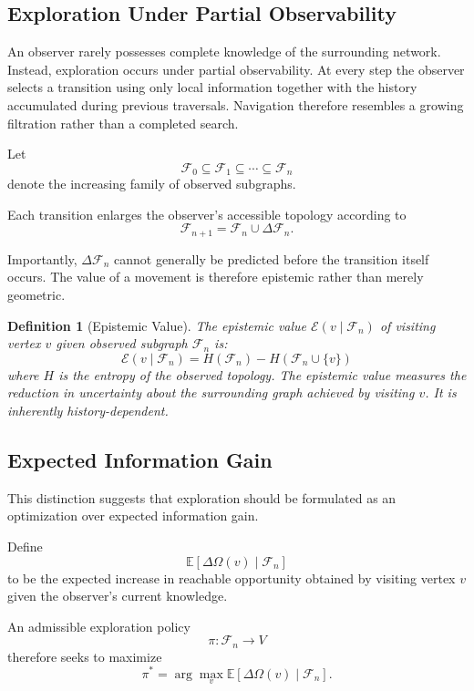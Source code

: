 \documentclass[12pt,oneside]{article}
\newtheorem{definition}{Definition}[section]
\theoremstyle{remark}
\begin{document}
\subsection{Exploration Under Partial Observability}

An observer rarely possesses complete knowledge of the surrounding network. Instead, exploration occurs under partial observability. At every step the observer selects a transition using only local information together with the history accumulated during previous traversals. Navigation therefore resembles a growing filtration rather than a completed search.

Let
\[
\mathcal{F}_0 \subseteq \mathcal{F}_1 \subseteq \cdots \subseteq \mathcal{F}_n
\]
denote the increasing family of observed subgraphs.

Each transition enlarges the observer's accessible topology according to
\[
\mathcal{F}_{n+1} = \mathcal{F}_n \cup \Delta\mathcal{F}_n.
\]

Importantly, \(\Delta\mathcal{F}_n\) cannot generally be predicted before the transition itself occurs. The value of a movement is therefore epistemic rather than merely geometric.

\begin{definition}[Epistemic Value]
The epistemic value \(\mathcal{E}(v \mid \mathcal{F}_n)\) of visiting vertex \(v\) given observed subgraph \(\mathcal{F}_n\) is:
\[
\mathcal{E}(v \mid \mathcal{F}_n) = H(\mathcal{F}_n) - H(\mathcal{F}_n \cup \{v\})
\]
where \(H\) is the entropy of the observed topology. The epistemic value measures the reduction in uncertainty about the surrounding graph achieved by visiting \(v\). It is inherently history-dependent.
\end{definition}

\subsection{Expected Information Gain}

This distinction suggests that exploration should be formulated as an optimization over expected information gain.

Define
\[
\mathbb{E}\left[\Delta\Omega(v) \mid \mathcal{F}_n\right]
\]
to be the expected increase in reachable opportunity obtained by visiting vertex \(v\) given the observer's current knowledge.

An admissible exploration policy
\[
\pi : \mathcal{F}_n \rightarrow V
\]
therefore seeks to maximize
\[
\pi^* = \arg\max_v \mathbb{E}\left[\Delta\Omega(v) \mid \mathcal{F}_n\right].
\]
\end{document}
